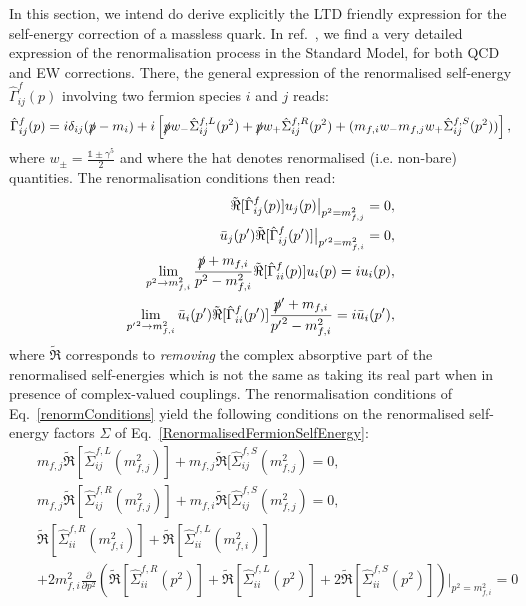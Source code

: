 \documentclass[11pt]{article}
\begin{document}
In this section, we intend do derive explicitly the LTD friendly expression for the self-energy correction of a massless quark.
In ref.~\cite{Denner:1991kt}, we find a very detailed expression of the renormalisation process in the Standard Model, for both QCD and EW corrections.
There, the general expression of the renormalised self-energy $\hat{\Gamma}^{f}_{ij}(p)$ involving two fermion species $i$ and $j$ reads:
\begin{equation}
\label{RenormalisedFermionSelfEnergy}
\hat{\Gamma}^{f}_{ij}(p) = i \delta_{ij} (\slashed{p} - m_i) + i \left [ 
\slashed{p} w_- \hat{\Sigma}_{ij}^{f,L}(p^2) + \slashed{p} w_+ \hat{\Sigma}_{ij}^{f,R}(p^2) + (m_{f,i}w_- m_{f,j}w_+ \hat{\Sigma}_{ij}^{f,S}(p^2) ) \right ],
\end{equation}
where $w_\pm=\frac{\mathbb{1}\pm\gamma^5}{2}$ and where the hat denotes renormalised (i.e. non-bare) quantities.
The renormalisation conditions then read:
\begin{eqnarray}
\label{renormConditions}
\tilde{\Re}[\hat{\Gamma}^{f}_{ij}(p)]u_j(p) {\big |}_{p^2=m_{f,j}^2} = 0, \\
\bar{u}_j(p') \tilde{\Re}[\hat{\Gamma}^{f}_{ij}(p')] {\big |}_{{p'}^2=m_{f,i}^2} = 0, \\
\lim_{p^2\rightarrow m_{f,i}^2} \frac{\slashed{p}+m_{f,i}}{p^2-m_{f,i}^2} \tilde{\Re}[\hat{\Gamma}^{f}_{ii}(p)]u_i(p) = i u_i(p), \\
\lim_{{p'}^2\rightarrow m_{f,i}^2} \bar{u}_i(p') \tilde{\Re}[\hat{\Gamma}^{f}_{ii}(p')] \frac{\slashed{p}'+m_{f,i}}{{p'}^2-m_{f,i}^2} = i \bar{u}_i(p'),
\end{eqnarray}
where $\tilde{\Re}$ corresponds to \emph{removing} the complex absorptive part of the renormalised self-energies which is not the same as taking its real part when in presence of complex-valued couplings.
The renormalisation conditions of Eq.~\ref{renormConditions} yield the following conditions on the renormalised self-energy factors $\Sigma$ of Eq.~\ref{RenormalisedFermionSelfEnergy}:
\begin{eqnarray}
&&m_{f,j} \tilde{\Re} [ \hat{\Sigma}^{f,L}_{ij}(m_{f,j}^2)] + m_{f,j}  \tilde{\Re} [ \hat{\Sigma}^{f,S}_{ij}(m_{f,j}^2) = 0,\\
&&m_{f,j} \tilde{\Re} [ \hat{\Sigma}^{f,R}_{ij}(m_{f,j}^2)] + m_{f,i}  \tilde{\Re} [ \hat{\Sigma}^{f,S}_{ij}(m_{f,j}^2) = 0,\\
&&\tilde{\Re} [ \hat{\Sigma}^{f,R}_{ii}(m_{f,i}^2)] + \tilde{\Re} [ \hat{\Sigma}^{f,L}_{ii}(m_{f,i}^2)] \nonumber\\
&&+ 2 m_{f,i}^2 \frac{\partial}{\partial p^2} \left(
\tilde{\Re} [ \hat{\Sigma}^{f,R}_{ii}(p^2)] + \tilde{\Re} [ \hat{\Sigma}^{f,L}_{ii}(p^2)] +  2  \tilde{\Re} [ \hat{\Sigma}^{f,S}_{ii}(p^2)]
\right){\big |}_{p^2=m_{f,i}^2} =0 
\label{FinalRenormConditionGeneral}
\end{eqnarray}
\end{document}
